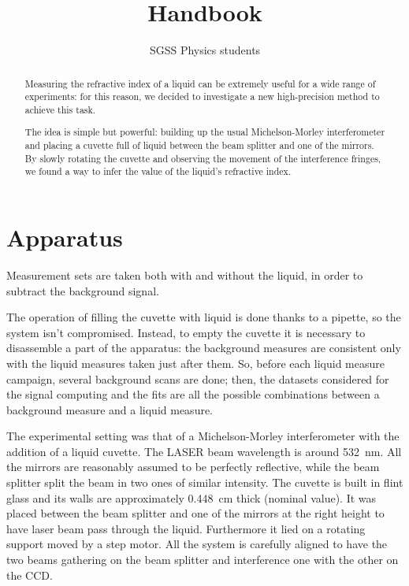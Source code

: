 \documentclass[a4paper, 12pt]{article}
\title{Handbook}
\author{SGSS Physics students}
\begin{document}
\maketitle

\begin{abstract}
Measuring the refractive index of a liquid can be extremely useful for a wide range of experiments: for this reason, we decided to investigate a new high-precision method to achieve this task.

The idea is simple but powerful: building up the usual Michelson-Morley interferometer and placing a cuvette full of liquid between the beam splitter and one of the mirrors. By slowly rotating the cuvette and observing the movement of the interference fringes, we found a way to infer the value of the liquid’s refractive index.
\end{abstract}

\section{Apparatus}

Measurement sets are taken both with and without the liquid, in order to subtract the background signal.

The operation of filling the cuvette with liquid is done thanks to a pipette, so the system isn’t compromised. Instead, to empty the cuvette it is necessary to disassemble a part of the apparatus: the background measures are consistent only with the liquid measures taken just after them.
So, before each liquid measure campaign, several background scans are done; then, the datasets considered for the signal computing and the fits are all the possible combinations between a background measure and a liquid measure.

The experimental setting was that of a Michelson-Morley interferometer with the addition of a liquid cuvette. The LASER beam wavelength is around \SI{532}{nm}. All the
mirrors are reasonably assumed to be perfectly reflective, while the beam splitter split the beam in two ones of similar intensity. The cuvette is built in flint glass and its walls
are approximately \SI{0.448}{cm} thick (nominal value). It was placed between the beam splitter and one of the mirrors at the right height to have laser beam pass through the
liquid. Furthermore it lied on a rotating support moved by a step motor. All the system is carefully aligned to have the two beams gathering on the beam splitter and interference
one with the other on the CCD.
\end{document}
